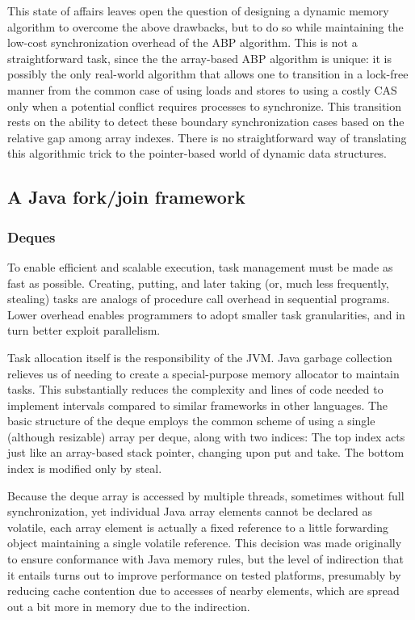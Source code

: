 This state of affairs leaves open the question of designing a dynamic
memory algorithm to overcome the above drawbacks, but to do so while
maintaining the low-cost synchronization overhead of the ABP
algorithm. This is not a straightforward task, since the the
array-based ABP algorithm is unique: it is possibly the only
real-world algorithm that allows one to transition in a lock-free
manner from the common case of using loads and stores to using a
costly CAS only when a potential conflict requires processes to
synchronize. This transition rests on the ability to detect these
boundary synchronization cases based on the relative gap among array
indexes. There is no straightforward way of translating this
algorithmic trick to the pointer-based world of dynamic data
structures.

\subsection{A Java fork/join framework \cite{Lea2000}}

\subsubsection{Deques}

To enable efficient and scalable execution, task management must be
made as fast as possible. Creating, putting, and later taking (or,
much less frequently, stealing) tasks are analogs of procedure call
overhead in sequential programs. Lower overhead enables programmers to
adopt smaller task granularities, and in turn better exploit
parallelism.

Task allocation itself is the responsibility of the JVM. Java garbage
collection relieves us of needing to create a special-purpose memory
allocator to maintain tasks. This substantially reduces the complexity
and lines of code needed to implement intervals compared to similar
frameworks in other languages. The basic structure of the deque
employs the common scheme of using a single (although resizable) array
per deque, along with two indices: The top index acts just like an
array-based stack pointer, changing upon put and take. The bottom
index is modified only by steal.

Because the deque array is accessed by multiple threads, sometimes
without full synchronization, yet individual Java array elements
cannot be declared as volatile, each array element is actually a fixed
reference to a little forwarding object maintaining a single volatile
reference. This decision was made originally to ensure conformance
with Java memory rules, but the level of indirection that it entails
turns out to improve performance on tested platforms, presumably by
reducing cache contention due to accesses of nearby elements, which
are spread out a bit more in memory due to the indirection.

